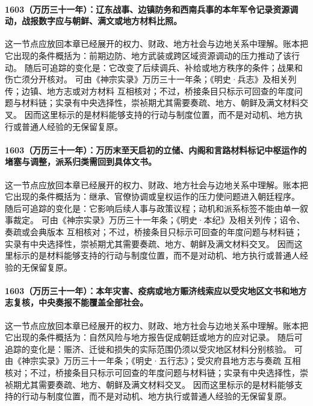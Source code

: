 \paragraph{1603（万历三十一年）：辽东战事、边镇防务和西南兵事的本年军令记录资源调动，战报数字应与朝鲜、满文或地方材料比照。} 这一节点应放回本章已经展开的权力、财政、地方社会与边地关系中理解。账本把它出现的条件概括为：前期边防、地方武装或跨区域资源调动的压力推动了该行动。 随后可追踪的变化是：它改变了后续调兵、补给或地方秩序的条件；战果和伤亡须分开核对。 可由《神宗实录》万历三十一年条；《明史·兵志》及相关列传；边镇、地方志或对方材料 互相核对；不过，桥接条目只标示可回查的年度问题与材料链；实录有中央选择性，崇祯期尤其需要奏疏、地方、朝鲜及满文材料交叉。 因而这里标示的是材料能够支持的行动与制度位置，而不是对动机、地方执行或普通人经验的无保留复原。

\paragraph{1603（万历三十一年）：万历末至天启初的立储、内阁和言路材料标记中枢运作的堵塞与调整，派系归类需回到具体文书。} 这一节点应放回本章已经展开的权力、财政、地方社会与边地关系中理解。账本把它出现的条件概括为：继承、官僚协调或皇权运作的压力使问题进入朝廷程序。 随后可追踪的变化是：它影响后续人事与政策议程；动机和派系标签不能由单一叙事裁定。 可由《神宗实录》万历三十一年条；《明史·本纪》及相关列传；诏令、奏疏或会典版本 互相核对；不过，桥接条目只标示可回查的年度问题与材料链；实录有中央选择性，崇祯期尤其需要奏疏、地方、朝鲜及满文材料交叉。 因而这里标示的是材料能够支持的行动与制度位置，而不是对动机、地方执行或普通人经验的无保留复原。

\paragraph{1603（万历三十一年）：本年灾害、疫病或地方赈济线索应以受灾地区文书和地方志复核，中央奏报不能覆盖全部社会。} 这一节点应放回本章已经展开的权力、财政、地方社会与边地关系中理解。账本把它出现的条件概括为：自然风险与地方报告促成朝廷或地方的应对记录。 随后可追踪的变化是：赈济、迁徙和损失的实际范围仍须以受灾地区材料分别核验。 可由《神宗实录》万历三十一年条；《明史·五行志》；受灾府县地方志与奏疏 互相核对；不过，桥接条目只标示可回查的年度问题与材料链；实录有中央选择性，崇祯期尤其需要奏疏、地方、朝鲜及满文材料交叉。 因而这里标示的是材料能够支持的行动与制度位置，而不是对动机、地方执行或普通人经验的无保留复原。

